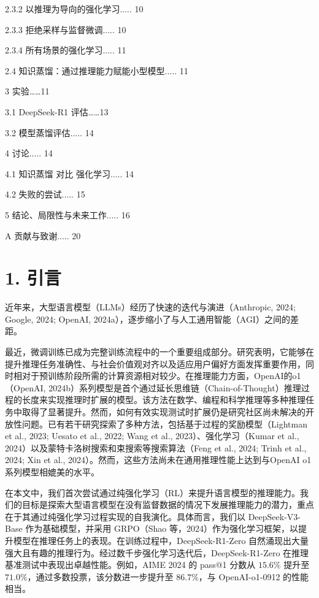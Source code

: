 \documentclass[12pt,a4paper]{report} %
\begin{document}
2.3.2 以推理为导向的强化学习..... 10


2.3.3 拒绝采样与监督微调..... 10


2.3.4 所有场景的强化学习..... 11


2.4 知识蒸馏：通过推理能力赋能小型模型..... 11


3 实验……11


3.1 DeepSeek-R1 评估……13


3.2 模型蒸馏评估..... 14


4 讨论..... 14


4.1 知识蒸馏 对比 强化学习..... 14


4.2 失败的尝试..... 15


5 结论、局限性与未来工作..... 16


A 贡献与致谢..... 20
\section*{1. 引言}


近年来，大型语言模型（LLMs）经历了快速的迭代与演进（Anthropic, 2024; Google, 2024; OpenAI, 2024a），逐步缩小了与人工通用智能（AGI）之间的差距。


最近，微调训练已成为完整训练流程中的一个重要组成部分。研究表明，它能够在提升推理任务准确性、与社会价值观对齐以及适应用户偏好方面发挥重要作用，同时相对于预训练阶段所需的计算资源相对较少。在推理能力方面，OpenAI的o1（OpenAI, 2024b）系列模型是首个通过延长思维链（Chain-of-Thought）推理过程的长度来实现推理时扩展的模型。该方法在数学、编程和科学推理等多种推理任务中取得了显著提升。然而，如何有效实现测试时扩展仍是研究社区尚未解决的开放性问题。已有若干研究探索了多种方法，包括基于过程的奖励模型（Lightman et al., 2023; Uesato et al., 2022; Wang et al., 2023）、强化学习（Kumar et al., 2024）以及蒙特卡洛树搜索和束搜索等搜索算法（Feng et al., 2024; Trinh et al., 2024; Xin et al., 2024）。然而，这些方法尚未在通用推理性能上达到与OpenAI o1系列模型相媲美的水平。


在本文中，我们首次尝试通过纯强化学习（RL）来提升语言模型的推理能力。我们的目标是探索大型语言模型在没有监督数据的情况下发展推理能力的潜力，重点在于其通过纯强化学习过程实现的自我演化。具体而言，我们以 DeepSeek-V3-Base 作为基础模型，并采用 GRPO（Shao 等，2024）作为强化学习框架，以提升模型在推理任务上的表现。在训练过程中，DeepSeek-R1-Zero 自然涌现出大量强大且有趣的推理行为。经过数千步强化学习迭代后，DeepSeek-R1-Zero 在推理基准测试中表现出卓越性能。例如，AIME 2024 的 pass@1 分数从 $15.6 \%$ 提升至 $71.0 \%$，通过多数投票，该分数进一步提升至 $86.7 \%$，与 OpenAI-o1-0912 的性能相当。
\end{document}
